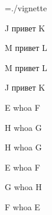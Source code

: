 \font\x=./vignette

\x J
\rm привет
\x K

M
\rm привет
\x L

\bigskip

M
\rm привет
\x L

J
\rm привет
\x K

\bigskip

E
\rm whoa
\x F

H
\rm whoa
\x G

\bigskip

H
\rm whoa
\x G

E
\rm whoa
\x F

\bigskip

G
\rm whoa
\x H

F
\rm whoa
\x E

\bye
